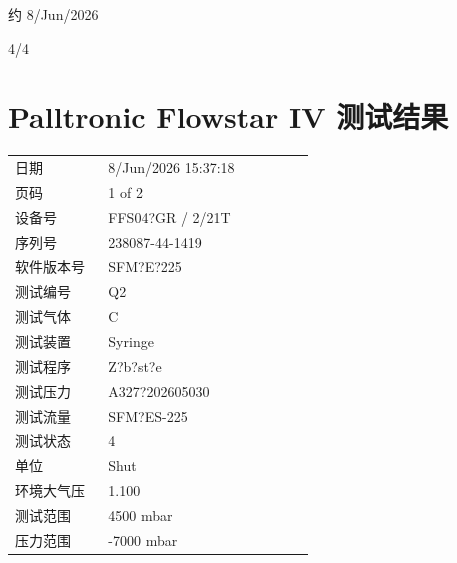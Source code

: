 \documentclass[UTF8,10pt,a4paper,fontset=fandol]{ctexart}
\newcommand{\fieldvalue}[1]{#1}
\newcommand{\handwritten}[1]{#1}
\begin{document}
\handwritten{约 8/Jun/2026}

\handwritten{4/4}


\newpage

\section{Palltronic Flowstar IV 测试结果}

\begin{tabular}{@{}p{0.28\linewidth}p{0.62\linewidth}@{}}
日期 &
\fieldvalue{8/Jun/2026 15:37:18}
\\
页码 &
\fieldvalue{1 of 2}
\\
设备号 &
\fieldvalue{FFS04?GR / 2/21T}
\\
序列号 &
\fieldvalue{238087-44-1419}
\\
软件版本号 &
\fieldvalue{SFM?E?225}
\\
测试编号 &
\fieldvalue{Q2}
\\
测试气体 &
\fieldvalue{C}
\\
测试装置 &
\fieldvalue{Syringe}
\\
测试程序 &
\fieldvalue{Z?b?st?e}
\\
测试压力 &
\fieldvalue{A327?202605030}
\\
测试流量 &
\fieldvalue{SFM?ES-225}
\\
测试状态 &
\fieldvalue{4}
\\
单位 &
\fieldvalue{Shut}
\\
环境大气压 &
\fieldvalue{1.100}
\\
测试范围 &
\fieldvalue{4500 mbar}
\\
压力范围 &
\fieldvalue{-7000 mbar}
\end{tabular}
\end{document}
